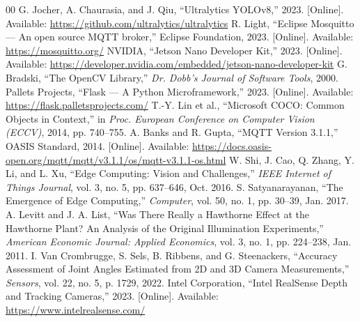 \documentclass[conference]{IEEEtran}
\begin{document}
\begin{thebibliography}{00}
 G. Jocher, A. Chaurasia, and J. Qiu, ``Ultralytics YOLOv8,'' 2023. [Online]. Available: \url{https://github.com/ultralytics/ultralytics}
 R. Light, ``Eclipse Mosquitto --- An open source MQTT broker,'' Eclipse Foundation, 2023. [Online]. Available: \url{https://mosquitto.org/}
 NVIDIA, ``Jetson Nano Developer Kit,'' 2023. [Online]. Available: \url{https://developer.nvidia.com/embedded/jetson-nano-developer-kit}
 G. Bradski, ``The OpenCV Library,'' \textit{Dr. Dobb's Journal of Software Tools}, 2000.
 Pallets Projects, ``Flask --- A Python Microframework,'' 2023. [Online]. Available: \url{https://flask.palletsprojects.com/}
 T.-Y. Lin et al., ``Microsoft COCO: Common Objects in Context,'' in \textit{Proc. European Conference on Computer Vision (ECCV)}, 2014, pp. 740--755.
 A. Banks and R. Gupta, ``MQTT Version 3.1.1,'' OASIS Standard, 2014. [Online]. Available: \url{https://docs.oasis-open.org/mqtt/mqtt/v3.1.1/os/mqtt-v3.1.1-os.html}
 W. Shi, J. Cao, Q. Zhang, Y. Li, and L. Xu, ``Edge Computing: Vision and Challenges,'' \textit{IEEE Internet of Things Journal}, vol. 3, no. 5, pp. 637--646, Oct. 2016.
 S. Satyanarayanan, ``The Emergence of Edge Computing,'' \textit{Computer}, vol. 50, no. 1, pp. 30--39, Jan. 2017.
 A. Levitt and J. A. List, ``Was There Really a Hawthorne Effect at the Hawthorne Plant? An Analysis of the Original Illumination Experiments,'' \textit{American Economic Journal: Applied Economics}, vol. 3, no. 1, pp. 224--238, Jan. 2011.
 I. Van Crombrugge, S. Sels, B. Ribbens, and G. Steenackers, ``Accuracy Assessment of Joint Angles Estimated from 2D and 3D Camera Measurements,'' \textit{Sensors}, vol. 22, no. 5, p. 1729, 2022.
 Intel Corporation, ``Intel RealSense Depth and Tracking Cameras,'' 2023. [Online]. Available: \url{https://www.intelrealsense.com/}
\end{thebibliography}
\end{document}
